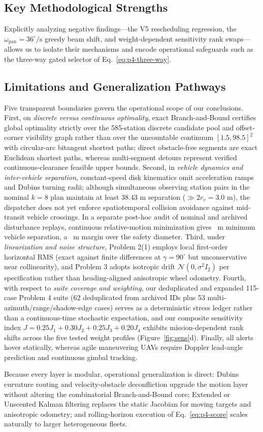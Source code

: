 \subsection{Key Methodological Strengths}
Explicitly analyzing negative findings—the V5 rescheduling regression, the $\omega_{\mathrm{pan}}=36^\circ/\text{s}$ greedy beam shift, and weight-dependent sensitivity rank swaps—allows us to isolate their mechanisms and encode operational safeguards such as the three-way gated selector of Eq.~\eqref{eq:p4-three-way}.

\subsection{Limitations and Generalization Pathways}
Five transparent boundaries govern the operational scope of our conclusions. First, on \emph{discrete versus continuous optimality}, exact Branch-and-Bound certifies global optimality strictly over the 585-station discrete candidate pool and offset-corner visibility graph rather than over the uncountable continuum $[1.5,98.5]^2$ with circular-arc bitangent shortest paths; direct obstacle-free segments are exact Euclidean shortest paths, whereas multi-segment detours represent verified continuous-clearance feasible upper bounds. Second, in \emph{vehicle dynamics and inter-vehicle separation}, constant-speed disk kinematics omit acceleration ramps and Dubins turning radii; although simultaneous observing station pairs in the nominal $k=8$ plan maintain at least $38.43$ m separation ($\gg 2r_v=3.0$ m), the dispatcher does not yet enforce spatiotemporal collision avoidance against mid-transit vehicle crossings. In a separate post-hoc audit of \BReplayCount{} nominal and archived disturbance replays, continuous relative-motion minimization gives \BReplayMin{}~m minimum vehicle separation, a \BReplayMargin{}~m margin over the safety diameter. Third, under \emph{linearization and noise structure}, Problem 2(1) employs local first-order horizontal RMS (exact against finite differences at $\gamma=90^\circ$ but unconservative near collinearity), and Problem 3 adopts isotropic drift $\mathcal{N}(0,\sigma^2 I_2)$ per specification rather than heading-aligned anisotropic wheel odometry. Fourth, with respect to \emph{suite coverage and weighting}, our deduplicated and expanded 115-case Problem 4 suite (62 deduplicated from \BCaseCount{} archived IDs plus 53 multi-azimuth/range/shadow-edge cases) serves as a deterministic stress ledger rather than a continuous-time stochastic expectation, and our composite sensitivity index $J=0.25J_1+0.30J_2+0.25J_3+0.20J_4$ exhibits mission-dependent rank shifts across the five tested weight profiles (Figure~\ref{fig:sens}d). Finally, all alerts hover statically, whereas agile maneuvering UAVs require Doppler lead-angle prediction and continuous gimbal tracking.

Because every layer is modular, operational generalization is direct: Dubins curvature routing and velocity-obstacle deconfliction upgrade the motion layer without altering the combinatorial Branch-and-Bound core; Extended or Unscented Kalman filtering replaces the static Jacobian for moving targets and anisotropic odometry; and rolling-horizon execution of Eq.~\eqref{eq:p4-score} scales naturally to larger heterogeneous fleets.
